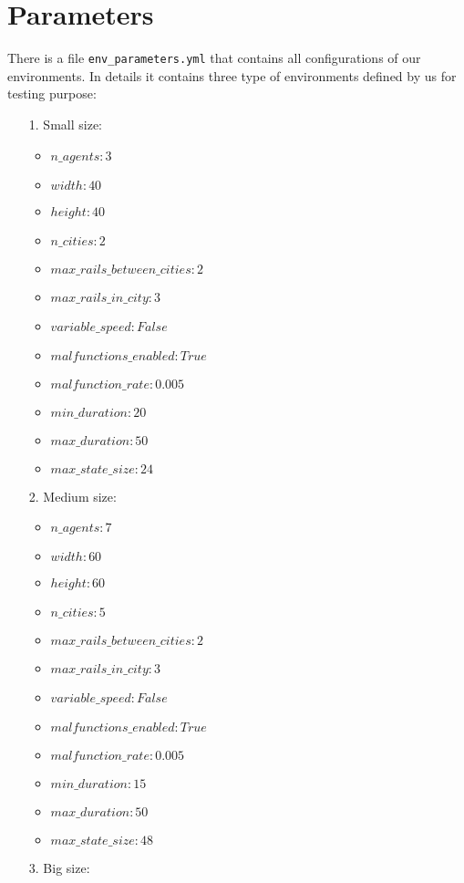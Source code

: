 \section{Parameters}
\label{sec:ourParameters}
There is a file \texttt{env\_parameters.yml} that contains all configurations of our environments. In details it contains three type of environments defined by us for testing purpose:
\begin{enumerate}
	\item [1.] Small size:
	\begin{itemize}
		\item $n\_agents: 3$
		\item $width: 40$
		\item $height: 40$
		\item $n\_cities: 2$
		\item $max\_rails\_between\_cities: 2$
		\item $max\_rails\_in\_city: 3$
		\item  $variable\_speed: False$
		\item $malfunctions\_enabled: True$
		\item $malfunction\_rate: 0.005$
		\item $min\_duration: 20$
		\item $max\_duration: 50$
		\item $max\_state\_size: 24$
	\end{itemize}
	\item [2.] Medium size:
		\begin{itemize}
		\item $n\_agents: 7 $
		\item $width: 60 $
		\item $height: 60 $
		\item $n\_cities: 5 $
		\item $max\_rails\_between\_cities: 2 $
		\item $max\_rails\_in\_city: 3 $
		\item  $variable\_speed: False $
		\item $malfunctions\_enabled: True $
		\item $malfunction\_rate: 0.005 $
		\item $min\_duration: 15 $
		\item $max\_duration: 50 $
		\item $max\_state\_size: 48$
	\end{itemize}
	\item [3.] Big size:
		\begin{itemize}

\end{itemize}
\end{enumerate}
